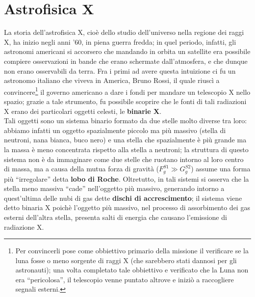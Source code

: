\section{Astrofisica X}
La storia dell'astrofisica X, cioè dello studio dell'universo nella regione dei raggi X, ha inizio negli anni '60, in piena guerra fredda; in quel periodo, infatti, gli astronomi americani si accorsero che mandando in orbita un satellite era possibile compiere osservazioni in bande che erano schermate dall'atmosfera, e che dunque non erano osservabili da terra. Fra i primi ad avere questa intuizione ci fu un astronomo italiano che viveva in America, Bruno Rossi, il quale riuscì a convincere\footnote{Per convincerli pose come obbiettivo primario della missione il verificare se la luna fosse o meno sorgente di raggi X (che sarebbero stati dannosi per gli astronauti); una volta completato tale obbiettivo e verificato che la Luna non era ``pericolosa'', il telescopio venne puntato altrove e iniziò a raccogliere segnali esterni.} il governo americano a dare i fondi per mandare un telescopio X nello spazio; grazie a tale strumento, fu possibile scoprire che le fonti di tali radiazioni X erano dei particolari oggetti celesti, le \textbf{binarie X}.\\
Tali oggetti sono un sistema binario formato da due stelle molto diverse tra loro: abbiamo infatti un oggetto spazialmente piccolo ma più massivo (stella di neutroni, nana bianca, buco nero) e una stella che spazialmente è più grande ma la massa è meno concentrata rispetto alla stella a neutroni; la struttura di questo sistema non è da immaginare come due stelle che ruotano intorno al loro centro di massa, ma a causa della mutua forza di gravità ($F_{g}^{S1} \gg G_{g}^{S2}$) assume una forma più ``irregolare'' detta \textbf{lobo di Roche}. Oltretutto, in tali sistemi si osserva che la stella meno massiva ``cade'' nell'oggetto più massivo, generando intorno a quest'ultima delle nubi di gas dette \textbf{dischi di accrescimento}; il sistema viene detto binaria X poichè l'oggetto più massivo, nel processo di assorbimento dei gas esterni dell'altra stella, presenta salti di energia che causano l'emissione di radiazione X.


